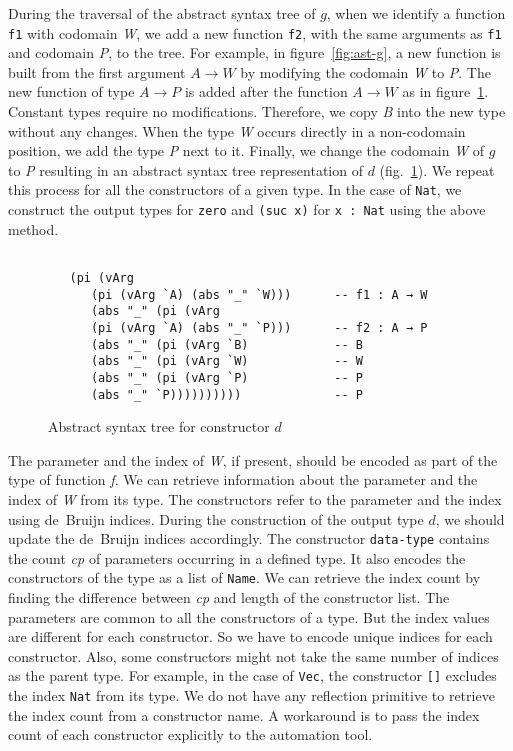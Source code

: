 \documentclass[sigplan,10pt]{acmart}
\begin{document}
\normalsize

During the traversal of the abstract syntax tree of $g$, when we identify a function {\tt f1} with codomain \emph{W}, we add a new function {\tt f2}, with the same arguments as {\tt f1} and codomain \emph{P}, to the tree. For example, in figure~\ref{fig:ast-g}, a new function is built from the first argument $A \rightarrow W$ by modifying the codomain \emph{W} to \emph{P}. The new function of type $A \rightarrow P$ is added after the function $A \rightarrow W$ as in figure~\ref{fig:ast-d}. Constant types require no modifications. Therefore, we copy \emph{B} into the new type without any changes. When the type \emph{W} occurs directly in a non-codomain position, we add the type \emph{P} next to it. Finally, we change the codomain \emph{W} of $g$ to \emph{P} resulting in an abstract syntax tree representation of $d$ (fig.~\ref{fig:ast-d}). We repeat this process for all the constructors of a given type. In the case of {\tt Nat}, we construct the output types for {\tt zero} and {\tt (suc x)} for {\tt x : Nat} using the above method.


\begin{figure}
\begin{center}
\begingroup
\fontsize{7pt}{9pt}\selectfont
\begin{Verbatim}[frame = single]

   (pi (vArg 
      (pi (vArg `A) (abs "_" `W)))      -- f1 : A → W
      (abs "_" (pi (vArg 
      (pi (vArg `A) (abs "_" `P)))      -- f2 : A → P
      (abs "_" (pi (vArg `B)            -- B
      (abs "_" (pi (vArg `W)            -- W
      (abs "_" (pi (vArg `P)            -- P
      (abs "_" `P))))))))))             -- P

\end{Verbatim}
\endgroup
\end{center}
\caption{Abstract syntax tree for constructor $d$}
\label{fig:ast-d}
\end{figure}

\normalsize

The parameter and the index of \emph{W}, if present, should be encoded as part of the type of function \emph{f}. We can retrieve information about the parameter and the index of \emph{W} from its type. The constructors refer to the parameter and the index using de~Bruijn indices. During the construction of the output type $d$, we should update the de~Bruijn indices accordingly. The constructor {\tt data-type} contains the count \emph{cp} of parameters occurring in a defined type. It also encodes the constructors of the type as a list of {\tt Name}. We can retrieve the index count by finding the difference between \emph{cp} and length of the constructor list. The parameters are common to all the constructors of a type. But the index values are different for each constructor. So we have to encode unique indices for each constructor. Also, some constructors might not take the same number of indices as the parent type. For example, in the case of {\tt Vec}, the constructor {\tt []} excludes the index {\tt Nat} from its type. We do not have any reflection primitive to retrieve the index count from a constructor name. A workaround is to pass the index count of each constructor explicitly to the automation tool.
\end{document}
